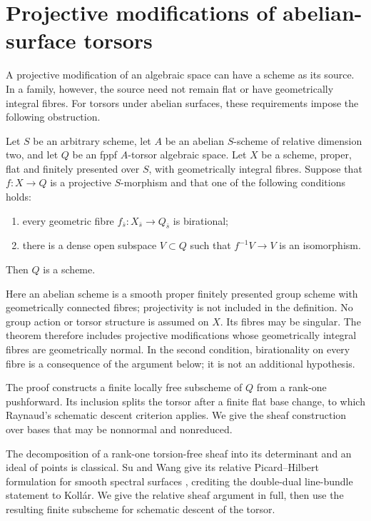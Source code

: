 \section{Projective modifications of abelian-surface torsors}
\label{sec:projective-modifications-torsors}

A projective modification of an algebraic space can have a scheme as
its source. In a family, however, the source need not remain flat or
have geometrically integral fibres. For torsors under abelian surfaces,
these requirements impose the following obstruction.

\begin{theorem}\label{thm:surface-torsor-modification}
Let $S$ be an arbitrary scheme, let $A$ be an abelian $S$-scheme of
relative dimension two, and let $Q$ be an fppf $A$-torsor algebraic space.
Let $X$ be a scheme, proper, flat and finitely presented over $S$, with
geometrically integral fibres. Suppose that $f:X\to Q$ is a projective $S$-morphism
and that one of the following conditions holds:
\begin{enumerate}
\item every geometric fibre $f_{\bar s}:X_{\bar s}\to Q_{\bar s}$ is
birational;
\item there is a dense open subspace $V\subset Q$ such that
$f^{-1}V\to V$ is an isomorphism.
\end{enumerate}
Then $Q$ is a scheme.
\end{theorem}

Here an abelian scheme is a smooth proper finitely presented group
scheme with geometrically connected fibres; projectivity is not
included in the definition. No group action or torsor structure
is assumed on $X$. Its fibres may be singular. The theorem therefore
includes projective modifications whose geometrically integral fibres
are geometrically normal. In the second condition,
birationality on every fibre is a consequence of the argument below;
it is not an additional hypothesis.

The proof constructs a finite locally free subscheme of $Q$ from a
rank-one pushforward. Its inclusion splits the torsor after a finite
flat base change, to which Raynaud's schematic descent criterion
applies. We give the sheaf construction over bases that may be
nonnormal and nonreduced.

The decomposition of a rank-one torsion-free sheaf into its determinant
and an ideal of points is classical. Su and Wang give its relative
Picard--Hilbert formulation for smooth spectral surfaces
\cite[Lemmas~3.22--3.23 and Remark~3.24, pp.~19--21]{SuWang},
crediting the double-dual line-bundle statement to Koll\'ar.
We give the relative sheaf argument in full, then use the resulting
finite subscheme for schematic descent of the torsor.

